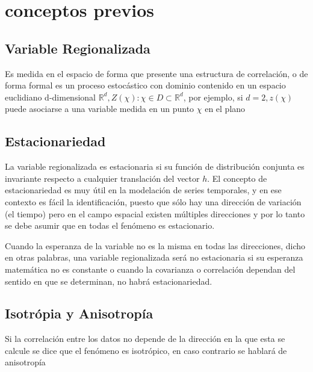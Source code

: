 
\section{conceptos previos}

\subsection{Variable Regionalizada}

Es medida en el espacio de forma que presente una estructura de correlación, o de forma formal es un proceso estocástico con dominio contenido en un espacio euclidiano d-dimensional $\mathbb{R}^d, Z(\chi): \chi \in D \subset \mathbb{R}^d$, por ejemplo, si $d=2, z(\chi)$ puede asociarse a una variable medida en un punto $\chi$ en el plano

\subsection{Estacionariedad}

La variable regionalizada es estacionaria si su función de distribución conjunta es invariante respecto a cualquier translación del vector $h$. El concepto de estacionariedad es muy útil en la modelación de series temporales, y en ese contexto es fácil la identificación, puesto que sólo hay una dirección de variación (el tiempo) pero en el campo espacial existen múltiples direcciones y por lo tanto se debe asumir que en todas el fenómeno es estacionario. 

Cuando la esperanza de la variable no es la misma en todas las direcciones, dicho en otras palabras, una variable regionalizada será no estacionaria si su esperanza matemática no es constante o cuando la covarianza o correlación dependan del sentido en que se determinan, no habrá estacionariedad.


\subsection{Isotrópia y Anisotropía}

Si la correlación entre los datos no depende de la dirección en la que esta se calcule se dice que el fenómeno es isotrópico, en caso contrario se hablará de anisotropía
